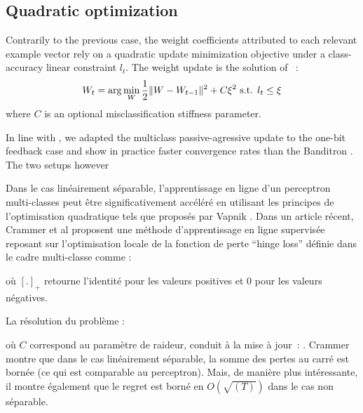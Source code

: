 \documentclass[preprint,12pt,authoryear]{elsarticle}
\begin{document}
\subsection{Quadratic optimization}
 
Contrarily to the previous case, the weight coefficients attributed to each relevant example vector rely on a quadratic update minimization objective under a class-accuracy linear constraint
$ l_t $.
The weight update is the solution of ~:
$$W_{t} = \arg \min_W \frac{1}{2} \| W - W_{t-1}\|^2 + C \xi^2 \hbox{ s.t. } l_t \leq \xi$$
where $C$ is an optional misclassification stiffness parameter.




In line with \cite{kakade2008efficient},  we adapted the multiclass passive-agressive update to the one-bit feedback case  and show in practice faster convergence rates than the Banditron . 
The two setups however 

Dans le cas linéairement séparable, l'apprentissage en ligne d'un perceptron multi-classes peut être significativement accéléré en utilisant les principes de l'optimisation quadratique tels que proposés par Vapnik \cite{vapnik1998statistical}. Dans un article récent, Crammer et al \cite{crammer2006online} proposent une méthode d'apprentissage en ligne supervisée reposant sur l'optimisation locale de la fonction de perte ``hinge loss'' définie dans le cadre multi-classe comme : 

où $[.]_+$ retourne l'identité pour les valeurs positives et 0 pour les valeurs négatives. 

La résolution du problème :

où $C$ correspond au paramètre de raideur, conduit à la mise à jour~:
. Crammer montre que dans le cas linéairement séparable, la somme des pertes au carré est bornée (ce qui est comparable au perceptron). Mais, de manière plus intéressante, il montre également que le regret est  borné en $O(\sqrt{(T)})$ dans le cas non séparable.
\end{document}

